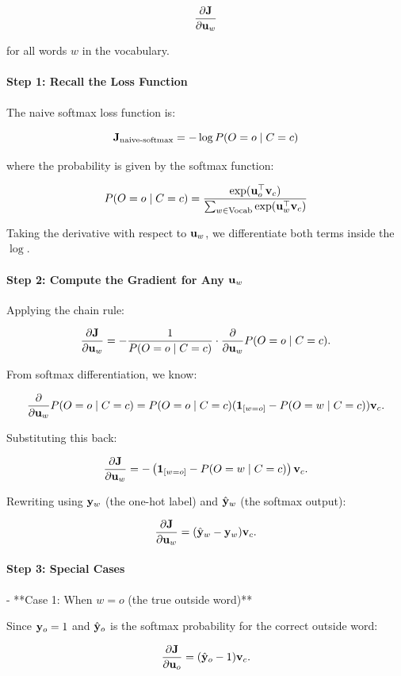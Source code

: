 \begin{parts}
{\[
\frac{\partial \mathbf{J}}{\partial \mathbf{u}_w}
\]

for all words $w$ in the vocabulary.

\paragraph{Step 1: Recall the Loss Function}
The naive softmax loss function is:

\[
\mathbf{J}_{\text{naive-softmax}} = -\log P(O = o \mid C = c)
\]

where the probability is given by the softmax function:

\[
P(O = o \mid C = c) = \frac{\exp(\mathbf{u}_o^\top \mathbf{v}_c)}{\sum_{w \in \text{Vocab}} \exp(\mathbf{u}_w^\top \mathbf{v}_c)}
\]

Taking the derivative with respect to $\mathbf{u}_w$, we differentiate both terms inside the $\log$.

\paragraph{Step 2: Compute the Gradient for Any $\mathbf{u}_w$}
Applying the chain rule:

\[
\frac{\partial \mathbf{J}}{\partial \mathbf{u}_w} = - \frac{1}{P(O = o \mid C = c)} \cdot \frac{\partial}{\partial \mathbf{u}_w} P(O = o \mid C = c).
\]

From softmax differentiation, we know:

\[
\frac{\partial}{\partial \mathbf{u}_w} P(O = o \mid C = c) =
P(O = o \mid C = c) ( \mathbf{1}_{[w = o]} - P(O = w \mid C = c) ) \mathbf{v}_c.
\]

Substituting this back:

\[
\frac{\partial \mathbf{J}}{\partial \mathbf{u}_w} = - \left( \mathbf{1}_{[w = o]} - P(O = w \mid C = c) \right) \mathbf{v}_c.
\]

Rewriting using $\mathbf{y}_w$ (the one-hot label) and $\hat{\mathbf{y}}_w$ (the softmax output):

\[
\frac{\partial \mathbf{J}}{\partial \mathbf{u}_w} = (\hat{\mathbf{y}}_w - \mathbf{y}_w) \mathbf{v}_c.
\]

\paragraph{Step 3: Special Cases}

- **Case 1: When $w = o$ (the true outside word)**

  Since $\mathbf{y}_o = 1$ and $\hat{\mathbf{y}}_o$ is the softmax probability for the correct outside word:

  \[
  \frac{\partial \mathbf{J}}{\partial \mathbf{u}_o} = (\hat{\mathbf{y}}_o - 1) \mathbf{v}_c.
  \]

}
\end{parts}
